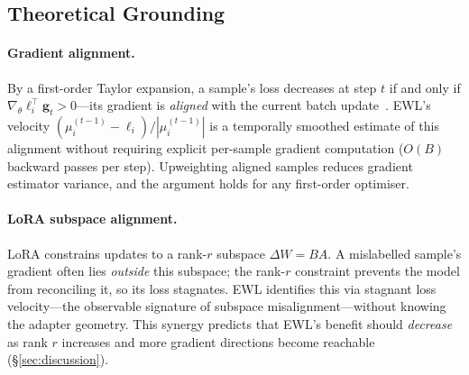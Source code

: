 \vspace{-1em}
\subsection{Theoretical Grounding}
\label{sec:theory}

\paragraph{Gradient alignment.}
By a first-order Taylor expansion, a sample's loss decreases at step $t$ if
and only if $\nabla_\theta\ell_i^\top\mathbf{g}_t > 0$---its gradient is
\emph{aligned} with the current batch update~\citep{katharopoulos2018notall}.
EWL's velocity $(\mu_i^{(t-1)} - \ell_i)/|\mu_i^{(t-1)}|$ is a temporally
smoothed estimate of this alignment without requiring explicit per-sample
gradient computation ($O(B)$ backward passes per step).
Upweighting aligned samples reduces gradient estimator variance, and the
argument holds for any first-order optimiser.

\paragraph{LoRA subspace alignment.}
LoRA constrains updates to a rank-$r$ subspace $\Delta W = BA$.
A mislabelled sample's gradient often lies \emph{outside} this subspace; the
rank-$r$ constraint prevents the model from reconciling it, so its loss
stagnates.
EWL identifies this via stagnant loss velocity---the observable signature of
subspace misalignment---without knowing the adapter geometry.
This synergy predicts that EWL's benefit should \emph{decrease} as rank $r$
increases and more gradient directions become reachable (\S\ref{sec:discussion}).

